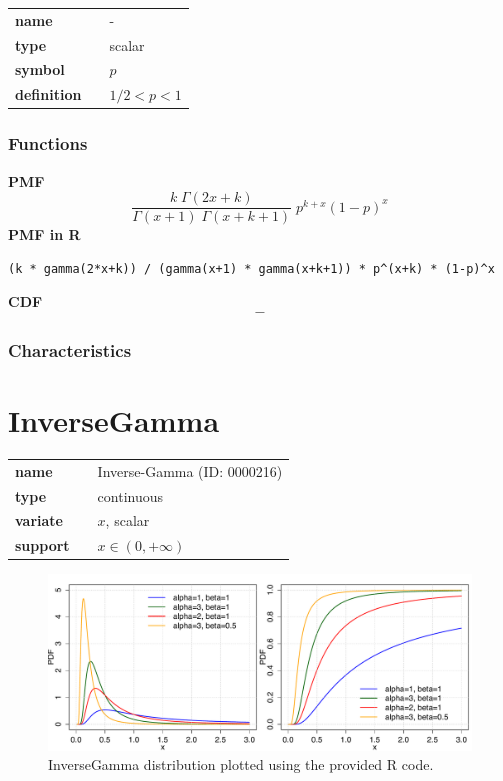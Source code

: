\noindent\begin{tabular}{p{2cm}cl}
\textbf{name} & & - \\
\textbf{type} & & scalar \\
\textbf{symbol} & & $p$  \\
\textbf{definition} & & $1/2 < p < 1$
\end{tabular}
\subsubsection*{Functions}

\smallskip \noindent \hspace{.2cm} \textbf{PMF} 
\begin{equation*}\frac{k \; \Gamma(2x + k)}{\Gamma(x+1) \;\Gamma(x + k + 1)}  \; p^{k+x} (1-p)^x \end{equation*}
\smallskip \noindent \hspace{.2cm} \textbf{PMF in R}  
\begin{verbatim}(k * gamma(2*x+k)) / (gamma(x+1) * gamma(x+k+1)) * p^(x+k) * (1-p)^x\end{verbatim}
\smallskip \noindent \hspace{.2cm} \textbf{CDF} 
\begin{equation*}-\end{equation*}
\smallskip
\subsubsection*{Characteristics}
\smallskip
\section*{InverseGamma} 

  \bigskip 

\begin{tabular}{p{2cm}cl}
\textbf{name} & & Inverse-Gamma (ID: 0000216)\\ 
 
\textbf{type} & & continuous \\ 

\textbf{variate} & & $x$, scalar \\ 

\textbf{support} & & $x \in (0,+\infty)$
\end{tabular}

\begin{figure}[ht!]
\centering
  \includegraphics[width=140mm]{pics/InverseGamma.pdf}
 \caption{InverseGamma distribution plotted using the provided R code.}
 \label{fig:InverseGamma}
\end{figure}

